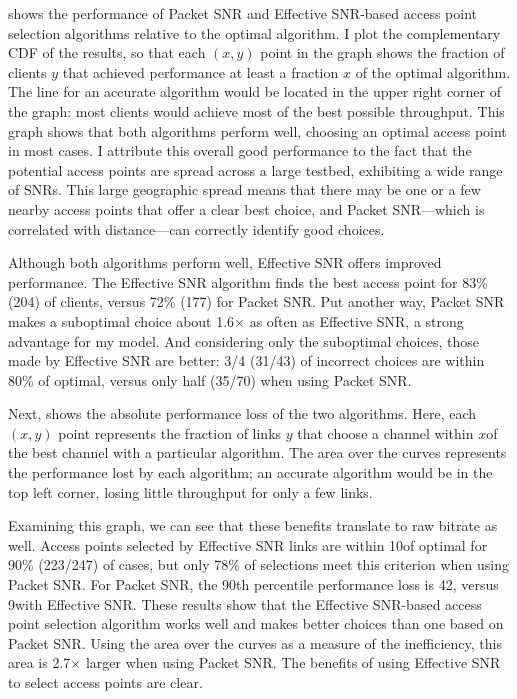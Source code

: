  shows the performance of Packet SNR and Effective SNR-based access point selection algorithms relative to the optimal algorithm. I plot the complementary CDF of the results, so that each $(x,y)$ point in the graph shows the fraction of clients $y$ that achieved performance at least a fraction $x$ of the optimal algorithm. The line for an accurate algorithm would be located in the upper right corner of the graph: most clients would achieve most of the best possible throughput.  This graph shows that both algorithms perform well, choosing an optimal access point in most cases. I attribute this overall good performance to the fact that the potential access points are spread across a large testbed, exhibiting a wide range of SNRs. This large geographic spread means that there may be one or a few nearby access points that offer a clear best choice, and Packet SNR---which is correlated with distance---can correctly identify good choices.

Although both algorithms perform well, Effective SNR offers improved performance. The Effective SNR algorithm finds the best access point for 83\% (204) of clients, versus 72\% (177) for Packet SNR. Put another way, Packet SNR makes a suboptimal choice about 1.6$\times$ as often as Effective SNR, a strong advantage for my model. And considering only the suboptimal choices, those made by Effective SNR are better: 3/4 (31/43) of incorrect choices are within 80\% of optimal, versus only half (35/70) when using Packet SNR.

Next,  shows the absolute performance loss of the two algorithms. Here, each $(x,y)$ point represents the fraction of links $y$ that choose a channel within $x$\Mbps of the best channel with a particular algorithm. The area over the curves represents the performance lost by each algorithm; an accurate algorithm would be in the top left corner, losing little throughput for only a few links.

Examining this graph, we can see that these benefits translate to raw bitrate as well. Access points selected by Effective SNR links are within 10\Mbps of optimal for 90\% (223/247) of cases, but only 78\% of selections meet this criterion when using Packet SNR. For Packet SNR, the 90th percentile performance loss is 42\Mbps, versus 9\Mbps with Effective SNR. These results show that the Effective SNR-based access point selection algorithm works well and makes better choices than one based on Packet SNR. Using the area over the curves as a measure of the inefficiency, this area is 2.7$\times$ larger when using Packet SNR. The benefits of using Effective SNR to select access points are clear.

